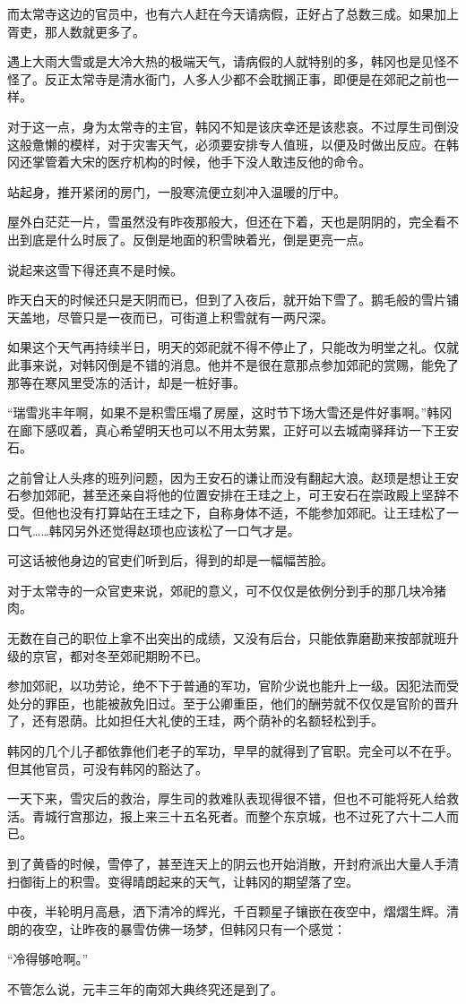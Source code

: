 而太常寺这边的官员中，也有六人赶在今天请病假，正好占了总数三成。如果加上胥吏，那人数就更多了。

遇上大雨大雪或是大冷大热的极端天气，请病假的人就特别的多，韩冈也是见怪不怪了。反正太常寺是清水衙门，人多人少都不会耽搁正事，即便是在郊祀之前也一样。

对于这一点，身为太常寺的主官，韩冈不知是该庆幸还是该悲哀。不过厚生司倒没这般惫懒的模样，对于灾害天气，必须要安排专人值班，以便及时做出反应。在韩冈还掌管着大宋的医疗机构的时候，他手下没人敢违反他的命令。

站起身，推开紧闭的房门，一股寒流便立刻冲入温暖的厅中。

屋外白茫茫一片，雪虽然没有昨夜那般大，但还在下着，天也是阴阴的，完全看不出到底是什么时辰了。反倒是地面的积雪映着光，倒是更亮一点。

说起来这雪下得还真不是时候。

昨天白天的时候还只是天阴而已，但到了入夜后，就开始下雪了。鹅毛般的雪片铺天盖地，尽管只是一夜而已，可街道上积雪就有一两尺深。

如果这个天气再持续半日，明天的郊祀就不得不停止了，只能改为明堂之礼。仅就此事来说，对韩冈倒是不错的消息。他并不是很在意那点参加郊祀的赏赐，能免了那等在寒风里受冻的活计，却是一桩好事。

“瑞雪兆丰年啊，如果不是积雪压塌了房屋，这时节下场大雪还是件好事啊。”韩冈在廊下感叹着，真心希望明天也可以不用太劳累，正好可以去城南驿拜访一下王安石。

之前曾让人头疼的班列问题，因为王安石的谦让而没有翻起大浪。赵顼是想让王安石参加郊祀，甚至还亲自将他的位置安排在王珪之上，可王安石在崇政殿上坚辞不受。但他也没有打算站在王珪之下，自称身体不适，不能参加郊祀。让王珪松了一口气……韩冈另外还觉得赵顼也应该松了一口气才是。

可这话被他身边的官吏们听到后，得到的却是一幅幅苦脸。

对于太常寺的一众官吏来说，郊祀的意义，可不仅仅是依例分到手的那几块冷猪肉。

无数在自己的职位上拿不出突出的成绩，又没有后台，只能依靠磨勘来按部就班升级的京官，都对冬至郊祀期盼不已。

参加郊祀，以功劳论，绝不下于普通的军功，官阶少说也能升上一级。因犯法而受处分的罪臣，也能被赦免旧过。至于公卿重臣，他们的酬劳就不仅仅是官阶的晋升了，还有恩荫。比如担任大礼使的王珪，两个荫补的名额轻松到手。

韩冈的几个儿子都依靠他们老子的军功，早早的就得到了官职。完全可以不在乎。但其他官员，可没有韩冈的豁达了。

一天下来，雪灾后的救治，厚生司的救难队表现得很不错，但也不可能将死人给救活。青城行宫那边，报上来三十五名死者。而整个东京城，也不过死了六十二人而已。

到了黄昏的时候，雪停了，甚至连天上的阴云也开始消散，开封府派出大量人手清扫御街上的积雪。变得晴朗起来的天气，让韩冈的期望落了空。

中夜，半轮明月高悬，洒下清冷的辉光，千百颗星子镶嵌在夜空中，熠熠生辉。清朗的夜空，让昨夜的暴雪仿佛一场梦，但韩冈只有一个感觉：

“冷得够呛啊。”

不管怎么说，元丰三年的南郊大典终究还是到了。


